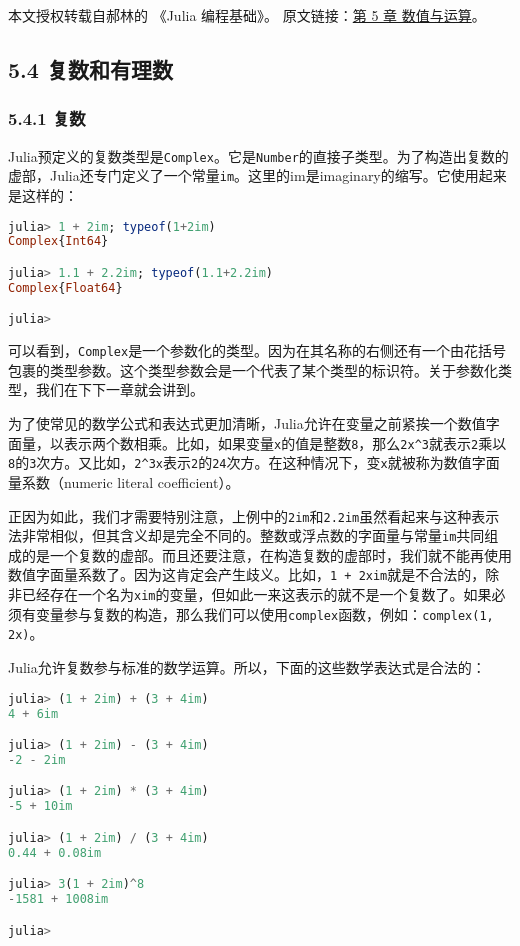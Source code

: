
本文授权转载自郝林的 《Julia 编程基础》。 原文链接：\href{https://github.com/hyper0x/JuliaBasics/blob/master/book/ch05.md}{第 5 章 数值与运算}。


\subsection{5.4 复数和有理数}

\subsubsection{5.4.1 复数}

Julia预定义的复数类型是\verb`Complex`。它是\verb`Number`的直接子类型。为了构造出复数的虚部，Julia还专门定义了一个常量\verb`im`。这里的im是imaginary的缩写。它使用起来是这样的：
\begin{lstlisting}[language=julia]
julia> 1 + 2im; typeof(1+2im)
Complex{Int64}

julia> 1.1 + 2.2im; typeof(1.1+2.2im)
Complex{Float64}

julia> 
\end{lstlisting}

可以看到，\verb`Complex`是一个参数化的类型。因为在其名称的右侧还有一个由花括号包裹的类型参数。这个类型参数会是一个代表了某个类型的标识符。关于参数化类型，我们在下下一章就会讲到。

为了使常见的数学公式和表达式更加清晰，Julia允许在变量之前紧挨一个数值字面量，以表示两个数相乘。比如，如果变量\verb`x`的值是整数\verb`8`，那么\verb`2x^3`就表示\verb`2`乘以\verb`8`的\verb`3`次方。又比如，\verb`2^3x`表示\verb`2`的\verb`24`次方。在这种情况下，变\verb`x`就被称为数值字面量系数（numeric literal coefficient）。

正因为如此，我们才需要特别注意，上例中的\verb`2im`和\verb`2.2im`虽然看起来与这种表示法非常相似，但其含义却是完全不同的。整数或浮点数的字面量与常量\verb`im`共同组成的是一个复数的虚部。而且还要注意，在构造复数的虚部时，我们就不能再使用数值字面量系数了。因为这肯定会产生歧义。比如，\verb`1 + 2xim`就是不合法的，除非已经存在一个名为\verb`xim`的变量，但如此一来这表示的就不是一个复数了。如果必须有变量参与复数的构造，那么我们可以使用\verb`complex`函数，例如：\verb`complex(1, 2x)`。

Julia允许复数参与标准的数学运算。所以，下面的这些数学表达式是合法的：
\begin{lstlisting}[language=julia]
julia> (1 + 2im) + (3 + 4im)
4 + 6im

julia> (1 + 2im) - (3 + 4im)
-2 - 2im

julia> (1 + 2im) * (3 + 4im)
-5 + 10im

julia> (1 + 2im) / (3 + 4im)
0.44 + 0.08im

julia> 3(1 + 2im)^8
-1581 + 1008im

julia> 
\end{lstlisting}

